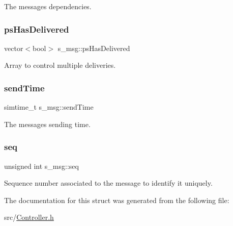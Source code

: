 The message\textquotesingle{}s dependencies. 

\mbox{\label{structs__msg_ac9b1dd0616f30d1eadfdeda272e1b238}} 
\subsubsection{\texorpdfstring{ps\+Has\+Delivered}{psHasDelivered}}
{\footnotesize\ttfamily vector$<$bool$>$ s\+\_\+msg\+::ps\+Has\+Delivered}



Array to control multiple deliveries. 

\mbox{\label{structs__msg_abf4a4c8c468860dec56cb8d69aba81b3}} 
\subsubsection{\texorpdfstring{send\+Time}{sendTime}}
{\footnotesize\ttfamily simtime\+\_\+t s\+\_\+msg\+::send\+Time}



The message\textquotesingle{}s sending time. 

\mbox{\label{structs__msg_a81ee20a1e6b791fdc215d88c0418e618}} 
\subsubsection{\texorpdfstring{seq}{seq}}
{\footnotesize\ttfamily unsigned int s\+\_\+msg\+::seq}



Sequence number associated to the message to identify it uniquely. 



The documentation for this struct was generated from the following file\+:\begin{DoxyCompactItemize}
\item 
src/\hyperlink{_controller_8h}{Controller.\+h}\end{DoxyCompactItemize}
